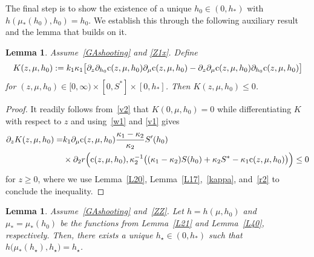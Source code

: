 \documentclass[reqno,11pt]{amsart}
\newtheorem{lem}[thm]{Lemma}
\numberwithin{equation}{section}
\begin{document}
The final step is to show the existence of a unique $h_0\in(0,h_*)$ with $h(\mu_*(h_0),h_0)=h_0$. We establish this through the following auxiliary result and the lemma that builds on it.

\begin{lem}\label{L30}
Assume~\eqref{GAshooting} and \eqref{Z1x}.  Define
\begin{equation*}
K(z,\mu,h_0):=k_1\kappa_1\big[\partial_z\partial_{h_0}{\rm c}(z,\mu,h_0)\partial_\mu{\rm c}(z,\mu,h_0)-\partial_z\partial_\mu{\rm c}(z,\mu,h_0)\partial_{h_0}{\rm c}(z,\mu,h_0)\big]
\end{equation*}
for $(z,\mu,h_0)\in[0,\infty)\times[0,S^*]\times[0,h_*]$. Then $K(z,\mu,h_0)\le 0$.
\end{lem}


\begin{proof}
It readily follows from~\eqref{v2} that
$K(0,\mu,h_0)=0$ while
differentiating $K$ with respect to $z$ and using~\eqref{w1} and \eqref{v1} gives
\begin{align}\label{Kprime}
\partial_z K(z,\mu,h_0)=&k_1\partial_\mu{\rm c}(z,\mu,h_0)\frac{\kappa_1-\kappa_2}{\kappa_2}S'(h_0)\\
&\times\partial_2 r\Big({\rm c}(z,\mu,h_0),\kappa_2^{-1}\big((\kappa_1-\kappa_2)S(h_0)+\kappa_2 S^*-\kappa_1{\rm c}(z,\mu,h_0)\big)\Big)\le 0 \nonumber
\end{align}
for $z\ge 0$, where we use Lemma~\ref{L20}, Lemma~\ref{L17},~\eqref{kappa}, and~\eqref{r2} to conclude the inequality.
\end{proof}



\begin{lem}\label{P30}
Assume~\eqref{GAshooting} and~\eqref{ZZ}. Let $h=h(\mu,h_0)$ and $\mu_*=\mu_*(h_0)$ be the functions from Lemma~\ref{L21} and Lemma~\ref{L40}, respectively. Then, there exists a unique $h_\star\in (0,h_*)$ such that $h\big(\mu_*(h_\star),h_\star)=h_\star$.
\end{lem}
\end{document}
